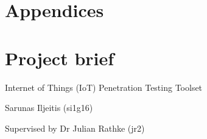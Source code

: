 \documentclass{article}
\begin{document}



\newpage
\tableofcontents

\newpage



\newpage









% 
\newpage


\section{Appendices}
\appendix


\section{Project brief}\label{sec:appendix-preject-brief}

Internet of Things (IoT) Penetration Testing Toolset

Sarunas Iljeitis (si1g16)

Supervised by Dr Julian Rathke (jr2)
\end{document}
